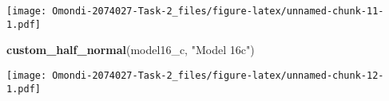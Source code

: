 \documentclass[
]{article}
\newenvironment{Shaded}{\begin{snugshade}}{\end{snugshade}}
\newcommand{\FunctionTok}[1]{\textcolor[rgb]{0.13,0.29,0.53}{\textbf{#1}}}
\newcommand{\NormalTok}[1]{#1}
\newcommand{\StringTok}[1]{\textcolor[rgb]{0.31,0.60,0.02}{#1}}
\begin{document}
\texttt{[image: Omondi-2074027-Task-2\_files/figure-latex/unnamed-chunk-11-1.pdf]}

\begin{Shaded}
\begin{Highlighting}[]
\FunctionTok{custom\_half\_normal}\NormalTok{(model16\_c, }\StringTok{"Model 16c"}\NormalTok{)}
\end{Highlighting}
\end{Shaded}

\texttt{[image: Omondi-2074027-Task-2\_files/figure-latex/unnamed-chunk-12-1.pdf]}
\end{document}
